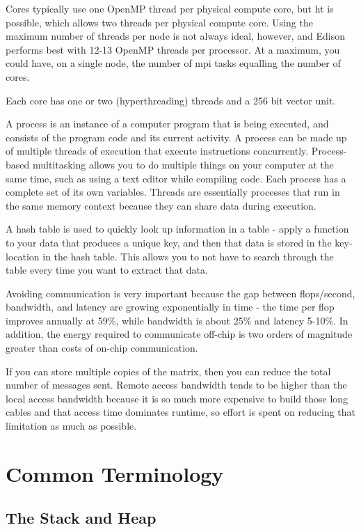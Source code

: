 \documentclass[10pt]{article}
\begin{document}
\begin{flushleft}
Cores typically use one OpenMP thread per physical compute core, but \gls{ht} is possible, which allows two threads per physical compute core.   Using the maximum number of threads per node is not always ideal, however, and Edison performs best with 12-13 OpenMP threads per processor. At a maximum, you could have, on a single node, the number of \gls{mpi} tasks equalling the number of cores.

Each core has one or two (hyperthreading) threads and a 256 bit vector unit. 

A process is an instance of a computer program that is being executed, and consists of the program code and its current activity. A process can be made up of multiple threads of execution that execute instructions concurrently. Process-based multitasking allows you to do multiple things on your computer at the same time, such as using a text editor while compiling code. Each process has a complete set of its own variables. Threads are essentially processes that run in the same memory context because they can share data during execution. 

A hash table is used to quickly look up information in a table - apply a function to your data that produces a unique key, and then that data is stored in the key-location in the hash table. This allows you to not have to search through the table every time you want to extract that data. 

Avoiding communication is very important because the gap between flops/second, bandwidth, and latency are growing exponentially in time - the time per flop improves annually at 59\%, while bandwidth is about 25\% and latency 5-10\%. In addition, the energy required to communicate off-chip is two orders of magnitude greater than costs of on-chip communication. 

If you can store multiple copies of the matrix, then you can reduce the total number of messages sent. Remote access bandwidth tends to be higher than the local access bandwidth because it is so much more expensive to build those long cables and that access time dominates runtime, so effort is spent on reducing that limitation as much as possible.

\section{Common Terminology}

\subsection{The Stack and Heap}


\end{flushleft}
\end{document}
